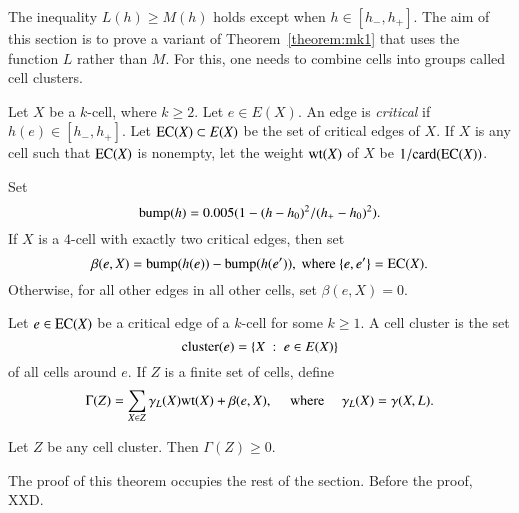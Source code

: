 The inequality $L(h)\ge M(h)$ holds except when $h\in [h_-,h_+]$.  The aim of this section is to prove a variant of Theorem~\ref{theorem:mk1} that uses the function $L$ rather than $M$.  For this, one needs to combine cells into groups called cell clusters.

\begin{definition}
Let $X$ be a $k$-cell, where $k\ge 2$.  Let $e\in E(X)$.
An edge is {\it critical} if $h(e)\in[h_-,h_+]$.
Let ${\operatorname{EC}}(X)\subset E(X)$ be the set of critical edges of $X$.  If $X$ is any cell such that ${\operatorname{EC}}(X)$ is nonempty, let the weight ${\operatorname{wt}}(X)$ of $X$  
be $1/{\operatorname{card}}({\operatorname{EC}}(X))$.
\end{definition}
%
%
%

\begin{definition}  Set 
$$
{\operatorname{bump}}(h) = 0.005 (1 - (h-h_0)^2/(h_+-h_0)^2).
$$
If $X$ is a $4$-cell with exactly two critical edges, then set
$$
\beta(e,X) = {\operatorname{bump}}(h(e)) - {\operatorname{bump}}(h(e')), \text{ where } \{e,e'\} = {\operatorname{EC}}(X).  
$$
Otherwise, for all other edges in all other cells, set $\beta(e,X) = 0$.
\end{definition}
%
%

\begin{definition}
Let $e\in {\operatorname{EC}}(X)$ be a critical edge of a $k$-cell for some $k\ge 1$.
A cell cluster is the set 
$$
{\operatorname{cluster}}(e) = \{X\ :\  e\in E(X)\} 
$$
%
of all cells around $e$. 
If $Z$ is a finite set of cells, define
%
$$
\Gamma(Z) = \sum_{X\in Z} \gamma_L(X) {\operatorname{wt}}(X) +\beta(e,X),\quad\hbox{ where }\quad
\gamma_L(X) = \gamma(X,L).
$$
%
%

\end{definition}
%

\begin{theorem}\label{lemma:cluster} 
Let $Z$ be any cell cluster.  Then $\Gamma(Z)\ge 0$.
\end{theorem}

The proof of this theorem occupies the rest of the section.  Before the proof, XXD.


